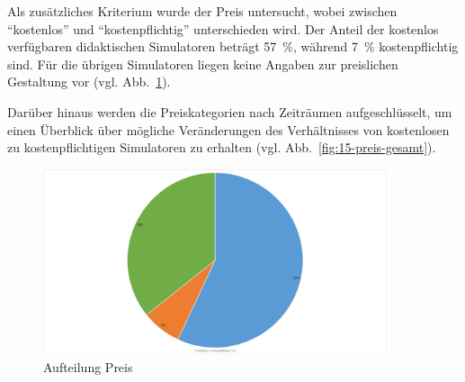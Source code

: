 Als zusätzliches Kriterium wurde der Preis untersucht, wobei zwischen \enquote{kostenlos} und \enquote{kostenpflichtig} unterschieden wird. Der Anteil der kostenlos verfügbaren didaktischen Simulatoren beträgt 57~\%, während 7~\% kostenpflichtig sind. Für die übrigen Simulatoren liegen keine Angaben zur preislichen Gestaltung vor (vgl. Abb.~\ref{fig:14-preis2}). 

Darüber hinaus werden die Preiskategorien nach Zeiträumen aufgeschlüsselt, um einen Überblick über mögliche Veränderungen des Verhältnisses von kostenlosen zu kostenpflichtigen Simulatoren zu erhalten (vgl. Abb.~\ref{fig:15-preis-gesamt}).

\begin{figure}[!htbp]
    \centering
    \caption{Aufteilung Preis}
    \label{fig:14-preis2}
    \includegraphics[width=0.90\textwidth]{graphics/14-preis3.png}
\end{figure}

